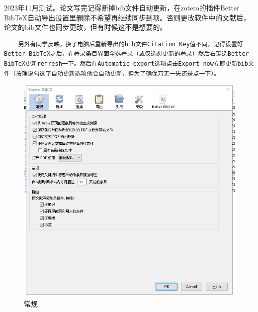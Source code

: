 2023年11月测试。论文写完记得断掉bib文件自动更新，在zotero的插件Better BibTeX自动导出设置里删除不希望再继续同步到项。否则更改软件中的文献后，论文的bib文件也同步更改，但有时候这不是想要的。
\begin{lstlisting}
    另外有同学反映，换了电脑后重新导出的bib文件Citation Key值不同，记得设置好Better BibTeX之后，在著录条目界面全选著录（或仅选想更新的著录）然后右键选Better BibTeX更新refresh一下。然后在Automatic export选项点击Export now立即更新bib文件（按理说勾选了自动更新选项他会自动更新，但为了确保万无一失还是点一下）。
\end{lstlisting}
\begin{figure}
	\centering
	\includegraphics[scale=0.8]{Fig/zotero1.png}
	\caption{\label{op1}常规}
\end{figure}

